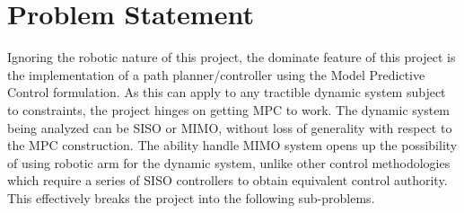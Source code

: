 \documentclass[12px]{article}
\begin{document}
    \section*{Problem Statement}

    Ignoring the robotic nature of this project, the dominate feature of this project is the implementation of a path planner/controller using the Model Predictive Control formulation. As this can apply to any tractible dynamic system subject to constraints, the project hinges on getting MPC to work. The dynamic system being analyzed can be SISO or MIMO, without loss of generality with respect to the MPC construction. The ability handle MIMO system opens up the possibility of using robotic arm for the dynamic system, unlike other control methodologies which require a series of SISO controllers to obtain equivalent control authority. This effectively breaks the project into the following sub-problems.
\end{document}
